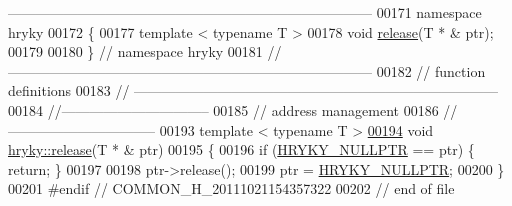 \begin{DoxyCode}
{      ------------------------------------------------------------------------------}
00171 \textcolor{keyword}{namespace }hryky
00172 \{
00177     \textcolor{keyword}{template} < \textcolor{keyword}{typename} T >
00178     \textcolor{keywordtype}{void} \hyperlink{namespacehryky_a9bdf380c3703ef316b807edae92a930a}{release}(T * & ptr);
00179 
00180 \} \textcolor{comment}{// namespace hryky}
00181 \textcolor{comment}{//
      ------------------------------------------------------------------------------}
00182 \textcolor{comment}{// function definitions}
00183 \textcolor{comment}{//
      ------------------------------------------------------------------------------}
00184 \textcolor{comment}{//--------------------------------}
00185 \textcolor{comment}{// address management}
00186 \textcolor{comment}{//--------------------------------}
00193 \textcolor{comment}{}\textcolor{keyword}{template} < \textcolor{keyword}{typename} T >
\hypertarget{common_8h_source_l00194}{}\hyperlink{namespacehryky_a23f2789a7915f2abfc21c0fed0c772b7}{00194} \textcolor{keywordtype}{void} \hyperlink{namespacehryky_a9bdf380c3703ef316b807edae92a930a}{hryky::release}(T * & ptr)
00195 \{
00196     \textcolor{keywordflow}{if} (\hyperlink{common_8h_a4cd4ac09cfcdbd6b30ee69afc156e210}{HRYKY_NULLPTR} == ptr) \{ \textcolor{keywordflow}{return}; \}
00197     
00198     ptr->release();
00199     ptr = \hyperlink{common_8h_a4cd4ac09cfcdbd6b30ee69afc156e210}{HRYKY_NULLPTR};
00200 \}
00201 \textcolor{preprocessor}{#endif // COMMON\_H\_20111021154357322}
00202 \textcolor{preprocessor}{}\textcolor{comment}{// end of file}
\end{DoxyCode}
